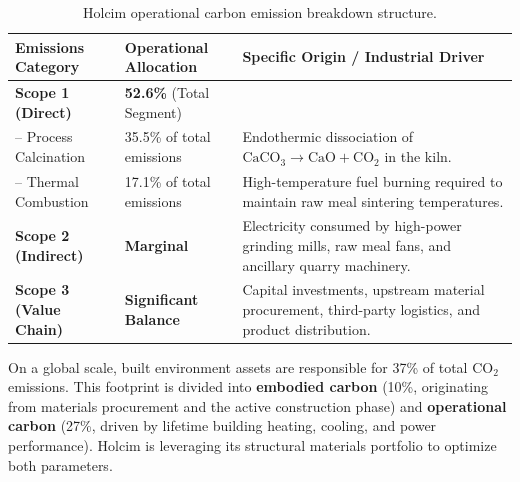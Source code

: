 \begin{table}[!ht]
\centering
\small
\begin{tabular}{llp{9cm}}
\toprule
\textbf{Emissions Category} & \textbf{Operational Allocation} & \textbf{Specific Origin / Industrial Driver} \\
\midrule
\textbf{Scope 1 (Direct)} & \textbf{52.6\%} (Total Segment) & \\
\quad -- Process Calcination & 35.5\% of total emissions & Endothermic dissociation of $\text{CaCO}_3 \rightarrow \text{CaO} + \text{CO}_2$ in the kiln.\\
\quad -- Thermal Combustion & 17.1\% of total emissions & High-temperature fuel burning required to maintain raw meal sintering temperatures.\\
\midrule
\textbf{Scope 2 (Indirect)} & \textbf{Marginal} & Electricity consumed by high-power grinding mills, raw meal fans, and ancillary quarry machinery.\\
\midrule
\textbf{Scope 3 (Value Chain)} & \textbf{Significant Balance} & Capital investments, upstream material procurement, third-party logistics, and product distribution.\\
\bottomrule
\end{tabular}
\caption{Holcim operational carbon emission breakdown structure.}
\label{tab:scopes}
\end{table}

On a global scale, built environment assets are responsible for \num{37}\% of total $\text{CO}_2$ emissions. This footprint is divided into \textbf{embodied carbon} (\num{10}\%, originating from materials procurement and the active construction phase) and \textbf{operational carbon} (\num{27}\%, driven by lifetime building heating, cooling, and power performance). Holcim is leveraging its structural materials portfolio to optimize both parameters.

